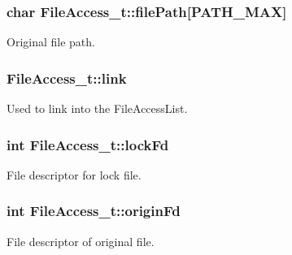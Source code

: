 \subsubsection[{\texorpdfstring{file\+Path}{filePath}}]{\setlength{\rightskip}{0pt plus 5cm}char File\+Access\+\_\+t\+::file\+Path\mbox{[}P\+A\+T\+H\+\_\+\+M\+AX\mbox{]}}\hypertarget{struct_file_access__t_ad36262b41639a0ec683987f2ca5cd3de}{}\label{struct_file_access__t_ad36262b41639a0ec683987f2ca5cd3de}


Original file path. 

\subsubsection[{\texorpdfstring{link}{link}}]{ File\+Access\+\_\+t\+::link}\hypertarget{struct_file_access__t_a5d30735fc24dd9b59585fee7f8a3589c}{}\label{struct_file_access__t_a5d30735fc24dd9b59585fee7f8a3589c}


Used to link into the File\+Access\+List. 

\subsubsection[{\texorpdfstring{lock\+Fd}{lockFd}}]{\setlength{\rightskip}{0pt plus 5cm}int File\+Access\+\_\+t\+::lock\+Fd}\hypertarget{struct_file_access__t_a1b94cf6338efa5664a9415408ccc0fb3}{}\label{struct_file_access__t_a1b94cf6338efa5664a9415408ccc0fb3}


File descriptor for lock file. 

\subsubsection[{\texorpdfstring{origin\+Fd}{originFd}}]{\setlength{\rightskip}{0pt plus 5cm}int File\+Access\+\_\+t\+::origin\+Fd}\hypertarget{struct_file_access__t_ab82577dbadfc8600ad1bf2a6075dfd8b}{}\label{struct_file_access__t_ab82577dbadfc8600ad1bf2a6075dfd8b}


File descriptor of original file. 

